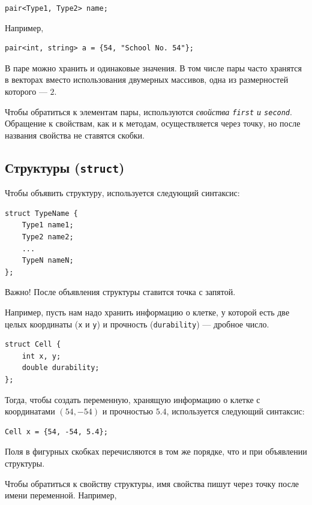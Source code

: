 \documentclass{article}
\newcommand{\important}[1]{
	\begin{sectionenv}[red!30!white]{Важно!}
		#1
	\end{sectionenv}
}
\begin{document}
	\begin{center}
		\texttt{pair<Type1, Type2> name;}
	\end{center}
	
	Например,
	
	\begin{lstlisting}
pair<int, string> a = {54, "School No. 54"};
	\end{lstlisting}
	
	В паре можно хранить и одинаковые значения. В том числе пары часто хранятся в векторах вместо использования двумерных массивов, одна из размерностей которого --- $2$.
	
	Чтобы обратиться к элементам пары, используются \textit{свойства \texttt{first} и \texttt{second}}. Обращение к свойствам, как и к методам, осуществляется через точку, но после названия свойства не ставятся скобки.
	
	\subsection{Структуры (\texttt{struct})}
	
	Чтобы объявить структуру, используется следующий синтаксис:
	
	\begin{lstlisting}
struct TypeName {
	Type1 name1;
	Type2 name2;
	...
	TypeN nameN;
};
	\end{lstlisting}
	
	\important{После объявления структуры ставится точка с запятой.}
	
	Например, пусть нам надо хранить информацию о клетке, у которой есть две целых координаты (\texttt{x} и \texttt{y}) и прочность (\texttt{durability}) --- дробное число.
	
	\begin{lstlisting}
struct Cell {
	int x, y;
	double durability;
};
	\end{lstlisting}
	
	Тогда, чтобы создать переменную, хранящую информацию о клетке с координатами $(54, -54)$ и прочностью $5.4$, используется следующий синтаксис:
	
	\begin{lstlisting}
Cell x = {54, -54, 5.4};
	\end{lstlisting}
	
	Поля в фигурных скобках перечисляются в том же порядке, что и при объявлении структуры.
	
	Чтобы обратиться к свойству структуры, имя свойства пишут через точку после имени переменной. Например,
	
\end{document}
